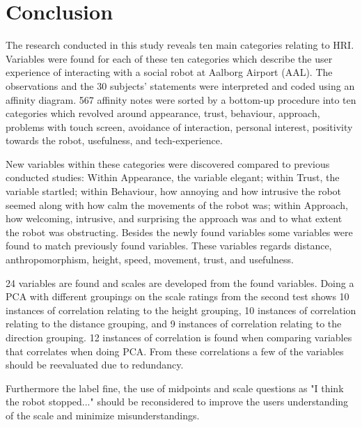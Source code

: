 \section{Conclusion}
\label{Conclusion}
%
The research conducted in this study reveals ten main categories relating to HRI. Variables were found for each of these ten categories which describe the user experience of interacting with a social robot at Aalborg Airport (AAL). The observations and the 30 subjects' statements were interpreted and coded using an affinity diagram. 567 affinity notes were sorted by a bottom-up procedure into ten categories which revolved around appearance, trust, behaviour, approach, problems with touch screen, avoidance of interaction, personal interest, positivity towards the robot, usefulness, and tech-experience.

New variables within these categories were discovered compared to previous conducted studies: Within Appearance, the variable elegant; within Trust, the variable startled; within Behaviour, how annoying and how intrusive the robot seemed along with how calm the movements of the robot was; within Approach, how welcoming, intrusive, and surprising the approach was and to what extent the robot was obstructing. Besides the newly found variables some variables were found to match previously found variables. These variables regards distance, anthropomorphism, height, speed, movement, trust, and usefulness.

24 variables are found and scales are developed from the found variables. Doing a PCA with different groupings on the scale ratings from the second test shows 10 instances of correlation relating to the height grouping, 10 instances of correlation relating to the distance grouping, and 9 instances of correlation relating to the direction grouping. 12 instances of correlation is found when comparing variables that correlates when doing PCA. From these correlations a few of the variables should be reevaluated due to redundancy.

Furthermore the label fine, the use of midpoints and scale questions as "I think the robot stopped..." should be reconsidered to improve the users understanding of the scale and minimize misunderstandings. 


